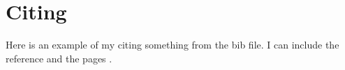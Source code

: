 %
%

\section{Citing}
Here is an example of my citing something from the bib file. I can include the reference and the pages \cite[pp.~150--153]{slides:Dallal-quant-and-code}.

